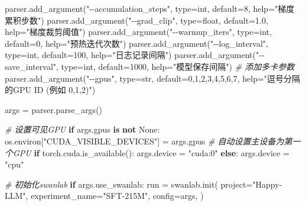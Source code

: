 \documentclass[
]{article}
\newenvironment{Shaded}{}{}
\newcommand{\BuiltInTok}[1]{\textcolor[rgb]{0.00,0.50,0.00}{#1}}
\newcommand{\CommentTok}[1]{\textcolor[rgb]{0.38,0.63,0.69}{\textit{#1}}}
\newcommand{\ControlFlowTok}[1]{\textcolor[rgb]{0.00,0.44,0.13}{\textbf{#1}}}
\newcommand{\DecValTok}[1]{\textcolor[rgb]{0.25,0.63,0.44}{#1}}
\newcommand{\FloatTok}[1]{\textcolor[rgb]{0.25,0.63,0.44}{#1}}
\newcommand{\KeywordTok}[1]{\textcolor[rgb]{0.00,0.44,0.13}{\textbf{#1}}}
\newcommand{\NormalTok}[1]{#1}
\newcommand{\OperatorTok}[1]{\textcolor[rgb]{0.40,0.40,0.40}{#1}}
\newcommand{\StringTok}[1]{\textcolor[rgb]{0.25,0.44,0.63}{#1}}
\newcommand{\VariableTok}[1]{\textcolor[rgb]{0.10,0.09,0.49}{#1}}
\begin{document}
\begin{Shaded}
\begin{Highlighting}[]
\NormalTok{    parser.add\_argument(}\StringTok{"{-}{-}accumulation\_steps"}\NormalTok{, }\BuiltInTok{type}\OperatorTok{=}\BuiltInTok{int}\NormalTok{, default}\OperatorTok{=}\DecValTok{8}\NormalTok{, }\BuiltInTok{help}\OperatorTok{=}\StringTok{"梯度累积步数"}\NormalTok{)}
\NormalTok{    parser.add\_argument(}\StringTok{"{-}{-}grad\_clip"}\NormalTok{, }\BuiltInTok{type}\OperatorTok{=}\BuiltInTok{float}\NormalTok{, default}\OperatorTok{=}\FloatTok{1.0}\NormalTok{, }\BuiltInTok{help}\OperatorTok{=}\StringTok{"梯度裁剪阈值"}\NormalTok{)}
\NormalTok{    parser.add\_argument(}\StringTok{"{-}{-}warmup\_iters"}\NormalTok{, }\BuiltInTok{type}\OperatorTok{=}\BuiltInTok{int}\NormalTok{, default}\OperatorTok{=}\DecValTok{0}\NormalTok{, }\BuiltInTok{help}\OperatorTok{=}\StringTok{"预热迭代次数"}\NormalTok{)}
\NormalTok{    parser.add\_argument(}\StringTok{"{-}{-}log\_interval"}\NormalTok{, }\BuiltInTok{type}\OperatorTok{=}\BuiltInTok{int}\NormalTok{, default}\OperatorTok{=}\DecValTok{100}\NormalTok{, }\BuiltInTok{help}\OperatorTok{=}\StringTok{"日志记录间隔"}\NormalTok{)}
\NormalTok{    parser.add\_argument(}\StringTok{"{-}{-}save\_interval"}\NormalTok{, }\BuiltInTok{type}\OperatorTok{=}\BuiltInTok{int}\NormalTok{, default}\OperatorTok{=}\DecValTok{1000}\NormalTok{, }\BuiltInTok{help}\OperatorTok{=}\StringTok{"模型保存间隔"}\NormalTok{)}
    \CommentTok{\# 添加多卡参数}
\NormalTok{    parser.add\_argument(}\StringTok{"{-}{-}gpus"}\NormalTok{, }\BuiltInTok{type}\OperatorTok{=}\BuiltInTok{str}\NormalTok{, default}\OperatorTok{=}\StringTok{\textquotesingle{}0,1,2,3,4,5,6,7\textquotesingle{}}\NormalTok{, }\BuiltInTok{help}\OperatorTok{=}\StringTok{"逗号分隔的GPU ID (例如 \textquotesingle{}0,1,2\textquotesingle{})"}\NormalTok{)}

\NormalTok{    args }\OperatorTok{=}\NormalTok{ parser.parse\_args()}

    \CommentTok{\# 设置可见GPU}
    \ControlFlowTok{if}\NormalTok{ args.gpus }\KeywordTok{is} \KeywordTok{not} \VariableTok{None}\NormalTok{:}
\NormalTok{        os.environ[}\StringTok{"CUDA\_VISIBLE\_DEVICES"}\NormalTok{] }\OperatorTok{=}\NormalTok{ args.gpus}
        \CommentTok{\# 自动设置主设备为第一个GPU}
        \ControlFlowTok{if}\NormalTok{ torch.cuda.is\_available():}
\NormalTok{            args.device }\OperatorTok{=} \StringTok{"cuda:0"}
        \ControlFlowTok{else}\NormalTok{:}
\NormalTok{            args.device }\OperatorTok{=} \StringTok{"cpu"}

    \CommentTok{\# 初始化swanlab}
    \ControlFlowTok{if}\NormalTok{ args.use\_swanlab:}
\NormalTok{        run }\OperatorTok{=}\NormalTok{ swanlab.init(}
\NormalTok{            project}\OperatorTok{=}\StringTok{"Happy{-}LLM"}\NormalTok{,}
\NormalTok{            experiment\_name}\OperatorTok{=}\StringTok{"SFT{-}215M"}\NormalTok{,}
\NormalTok{            config}\OperatorTok{=}\NormalTok{args,}
\NormalTok{        )}


\end{Highlighting}
\end{Shaded}
\end{document}
